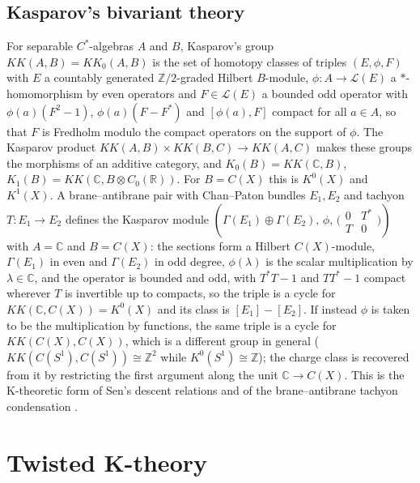 \documentclass[reqno,11pt]{amsart}
\theoremstyle{definition}
\newcommand{\ZZ}{\mathbb{Z}}
\newcommand{\RR}{\mathbb{R}}
\newcommand{\CC}{\mathbb{C}}
\newcommand{\KK}{K\!K}
\begin{document}
\subsection{Kasparov's bivariant theory}
For separable $C^*$-algebras $A$ and $B$, Kasparov's group $\KK(A,B)=\KK_0(A,B)$ \cite{Kas81} is the set of homotopy classes of triples $(E,\phi,F)$ with $E$ a countably generated $\ZZ/2$-graded Hilbert $B$-module, $\phi\colon A\to\mathcal L(E)$ a $*$-homomorphism by even operators and $F\in\mathcal L(E)$ a bounded odd operator with $\phi(a)(F^2-1)$, $\phi(a)(F-F^*)$ and $[\phi(a),F]$ compact for all $a\in A$, so that $F$ is Fredholm modulo the compact operators on the support of $\phi$. The Kasparov product $\KK(A,B)\times\KK(B,C)\to\KK(A,C)$ makes these groups the morphisms of an additive category, and $K_0(B)=\KK(\CC,B)$, $K_1(B)=\KK(\CC,B\otimes C_0(\RR))$. For $B=C(X)$ this is $K^0(X)$ and $K^1(X)$. A brane--antibrane pair with Chan--Paton bundles $E_1,E_2$ and tachyon $T\colon E_1\to E_2$ defines the Kasparov module $(\Gamma(E_1)\oplus\Gamma(E_2),\,\phi,\,\bigl(\begin{smallmatrix}0&T^*\\T&0\end{smallmatrix}\bigr))$ with $A=\CC$ and $B=C(X)$: the sections form a Hilbert $C(X)$-module, $\Gamma(E_1)$ in even and $\Gamma(E_2)$ in odd degree, $\phi(\lambda)$ is the scalar multiplication by $\lambda\in\CC$, and the operator is bounded and odd, with $T^*T-1$ and $TT^*-1$ compact wherever $T$ is invertible up to compacts, so the triple is a cycle for $\KK(\CC,C(X))=K^0(X)$ and its class is $[E_1]-[E_2]$. If instead $\phi$ is taken to be the multiplication by functions, the same triple is a cycle for $\KK(C(X),C(X))$, which is a different group in general ($\KK(C(S^1),C(S^1))\cong\ZZ^2$ while $K^0(S^1)\cong\ZZ$); the charge class is recovered from it by restricting the first argument along the unit $\CC\to C(X)$. This is the K-theoretic form of Sen's descent relations and of the brane--antibrane tachyon condensation \cite{Sen98,Sen98b,Wit98}.

\section{Twisted K-theory}\label{sec:twisted}
\end{document}
